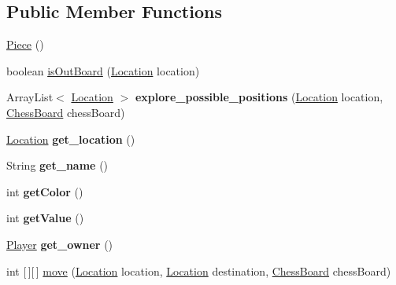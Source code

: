 \subsection*{Public Member Functions}
\begin{DoxyCompactItemize}
\item 
\hyperlink{class_game_1_1_piece_ac7bf4a99bb03a745e9b857c8091c3304}{Piece} ()
\item 
boolean \hyperlink{class_game_1_1_piece_a731841b5bb47df461d9de450386e937b}{is\+Out\+Board} (\hyperlink{class_game_1_1_location}{Location} location)
\item 
\mbox{\label{class_game_1_1_piece_af5a0f0900601ca2ba564c58f528e3e1f}} 
Array\+List$<$ \hyperlink{class_game_1_1_location}{Location} $>$ {\bfseries explore\+\_\+possible\+\_\+positions} (\hyperlink{class_game_1_1_location}{Location} location, \hyperlink{class_game_1_1_chess_board}{Chess\+Board} chess\+Board)
\item 
\mbox{\label{class_game_1_1_piece_a944c18376b6af8bd8d695867a1cb7ea6}} 
\hyperlink{class_game_1_1_location}{Location} {\bfseries get\+\_\+location} ()
\item 
\mbox{\label{class_game_1_1_piece_a2bc8c96480246808852708360cad25a1}} 
String {\bfseries get\+\_\+name} ()
\item 
\mbox{\label{class_game_1_1_piece_ac7d27da23e3311567b6e773c7da17da0}} 
int {\bfseries get\+Color} ()
\item 
\mbox{\label{class_game_1_1_piece_ac1da8a79281f3cd6fea02044c47a5b03}} 
int {\bfseries get\+Value} ()
\item 
\mbox{\label{class_game_1_1_piece_a5a0fcd7f275b131d76312dd58d851dee}} 
\hyperlink{class_game_1_1_player}{Player} {\bfseries get\+\_\+owner} ()
\item 
int \mbox{[}$\,$\mbox{]}\mbox{[}$\,$\mbox{]} \hyperlink{class_game_1_1_piece_a1edfb33b56e00ac858f1dfe34739c19e}{move} (\hyperlink{class_game_1_1_location}{Location} location, \hyperlink{class_game_1_1_location}{Location} destination, \hyperlink{class_game_1_1_chess_board}{Chess\+Board} chess\+Board)
\item 
\mbox{\label{class_game_1_1_piece_ab66d90e85bab97d03ddba72d3736ae27}} 

\end{DoxyCompactItemize}
